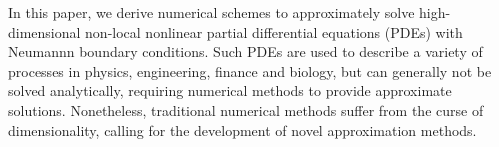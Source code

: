 
In this paper, we derive numerical schemes to approximately solve high-dimensional non-local nonlinear partial differential equations (PDEs) with Neumannn boundary conditions. 
%
Such PDEs are used to describe  a variety of processes in physics, engineering, finance and biology, but can generally not be solved analytically, requiring numerical methods to provide approximate solutions. Nonetheless, traditional numerical methods suffer from the curse of dimensionality, calling for the development of novel approximation methods.

